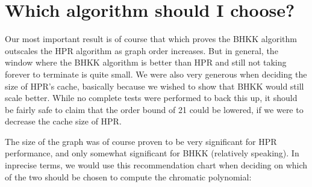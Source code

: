 \documentclass{cslthse-msc}
\begin{document}
\section{Which algorithm should I choose?}

Our most important result is of course that which proves the BHKK algorithm outscales the HPR algorithm as graph order increases. But in general, the window where the BHKK algorithm is better than HPR and still not taking forever to terminate is quite small. We were also very generous when deciding the size of HPR's cache, basically because we wished to show that BHKK would still scale better. While no complete tests were performed to back this up, it should be fairly safe to claim that the order bound of 21 could be lowered, if we were to decrease the cache size of HPR.

The size of the graph was of course proven to be very significant for HPR performance, and only somewhat significant for BHKK (relatively speaking). In inprecise terms, we would use this recommendation chart when deciding on which of the two should be chosen to compute the chromatic polynomial:

\begin{center}
\end{center}
\end{document}
